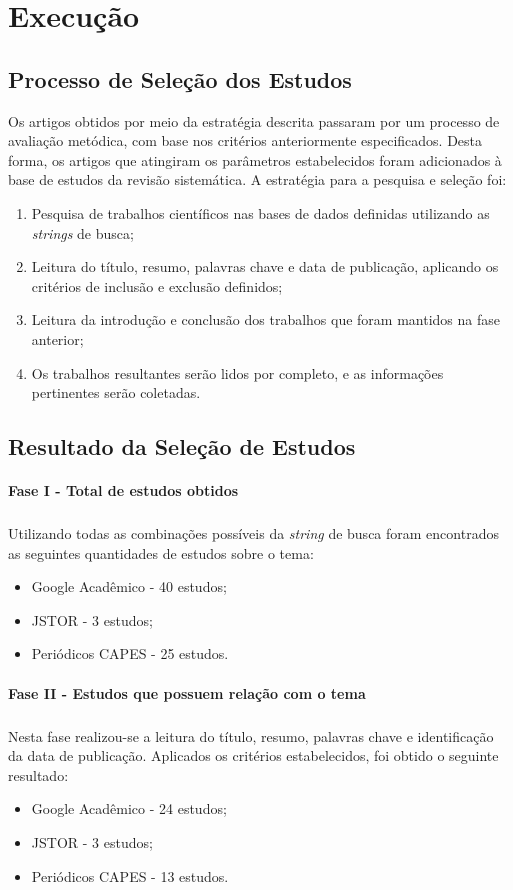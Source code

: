 \section{Execução}
\subsection{Processo de Seleção dos Estudos}
\quad Os artigos obtidos por meio da estratégia descrita passaram por um processo de avaliação metódica, com base nos critérios anteriormente especificados.
Desta forma, os artigos que atingiram os parâmetros estabelecidos foram adicionados à base de estudos da revisão sistemática. A estratégia para a pesquisa e seleção foi:
\begin{enumerate}
  \item Pesquisa de trabalhos científicos nas bases de dados definidas utilizando as \textit{strings} de busca;
  \item Leitura do título, resumo, palavras chave e data de publicação, aplicando os critérios de inclusão e exclusão definidos;
  \item Leitura da introdução e conclusão dos trabalhos que foram mantidos na fase anterior;
  \item Os trabalhos resultantes serão lidos por completo, e as informações pertinentes serão coletadas.
\end{enumerate}

\subsection{Resultado da Seleção de Estudos}
\paragraph{Fase I - Total de estudos obtidos}
\subparagraph{}
\quad Utilizando todas as combinações possíveis da \textit{string} de busca foram encontrados as seguintes quantidades de estudos sobre o tema:
\begin{itemize}
  \item Google Acadêmico - 40 estudos;
  \item JSTOR - 3 estudos;
  \item Periódicos CAPES - 25 estudos.
\end{itemize}
\paragraph{Fase II - Estudos que possuem relação com o tema}
\subparagraph{}
\quad Nesta fase realizou-se a leitura do título, resumo, palavras chave e identificação da data de publicação.
Aplicados os critérios estabelecidos, foi obtido o seguinte resultado:
\begin{itemize}
  \item Google Acadêmico - 24 estudos;
  \item JSTOR - 3 estudos;
  \item Periódicos CAPES - 13 estudos.
\end{itemize}
